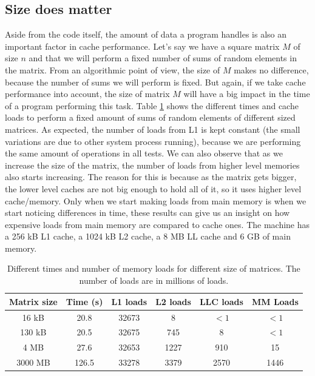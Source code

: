 \documentclass[12pt]{diicc}
\begin{document}
\subsection{Size does matter}

Aside from the code itself, the amount of data a program handles is also an important factor in cache performance. Let's say we have a square matrix $M$ of size $n$ and that we will perform a fixed number of sums of random elements in the matrix. From an algorithmic point of view, the size of $M$ makes no difference, because the number of sums we will perform is fixed. But again, if we take cache performance into account, the size of matrix $M$ will have a big impact in the time of a program performing this task. Table \ref{tab:matrix_size} shows the different times and cache loads to perform a fixed amount of sums of random elements of different sized matrices. As expected, the number of loads from L1 is kept constant (the small variations are due to other system process running), because we are performing the same amount of operations in all tests. We can also observe that as we increase the size of the matrix, the number of loads from higher level memories also starts increasing. The reason for this is because as the matrix gets bigger, the lower level caches are not big enough to hold all of it, so it uses higher level cache/memory. Only when we start making loads from main memory is when we start noticing differences in time, these results can give us an insight on how expensive loads from main memory are compared to cache ones. The machine has a 256 kB L1 cache, a 1024 kB L2 cache, a 8 MB LL cache and 6 GB of main memory.

\begin{table}
\begin{center}
\begin{tabular}{ c | c | c | c | c | c }
  Matrix size & Time (s) & L1 loads & L2 loads & LLC loads & MM Loads \\ \hline
  16 kB 	& 20.8 	& 32673  	& 8  		& $<1$  		& $<1$ 	 \\
  130 kB 	& 20.5 	& 32675  	& 745  		& 8			& $<1$  	 \\ 
  4 MB 		& 27.6	& 32653 	& 1227 		& 910		& 15 	\\
  3000 MB 	& 126.5	& 33278		& 3379		& 2570		& 1446   
\end{tabular}
\caption{Different times and number of memory loads for different size of matrices. The number of loads are in millions of loads.\label{tab:matrix_size}}
\end{center}
\end{table}
\end{document}
